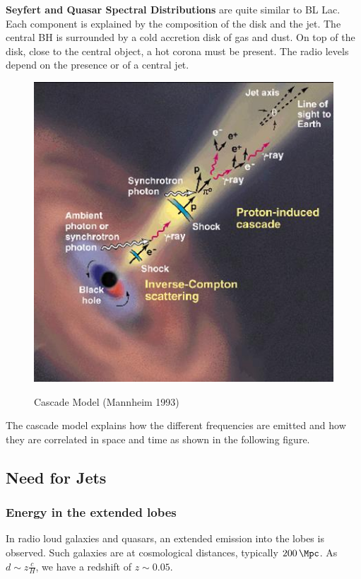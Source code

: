 \documentclass[10pt,a4paper,english]{article}
\begin{document}
\textbf{Seyfert and Quasar Spectral Distributions} are quite similar to BL Lac.
Each component is explained by the composition of the disk and the jet. The
central BH is surrounded by a cold accretion disk of gas and dust. On top of
the disk, close to the central object, a hot corona must be present. The radio
levels depend on the presence or of a central jet. 
\begin{figure}[!ht]
  \begin{center}
    \includegraphics{figures/Mannheim1993.jpg}
    \label{fig:mannheim1993}
    \caption{Cascade Model (Mannheim 1993)}
  \end{center}
\end{figure}

The cascade model explains how the different frequencies are emitted and how
they are correlated in space and time as shown in the following figure.

\subsection{Need for Jets}

\subsubsection{Energy in the extended lobes}

In radio loud galaxies and quasars, an extended emission into the lobes is
observed. Such galaxies are at cosmological distances, typically
$\SI{200}{\Mpc}$. As $d\sim z\frac{c }{H}$, we have a redshift of $z\sim 0.05$.
\end{document}
